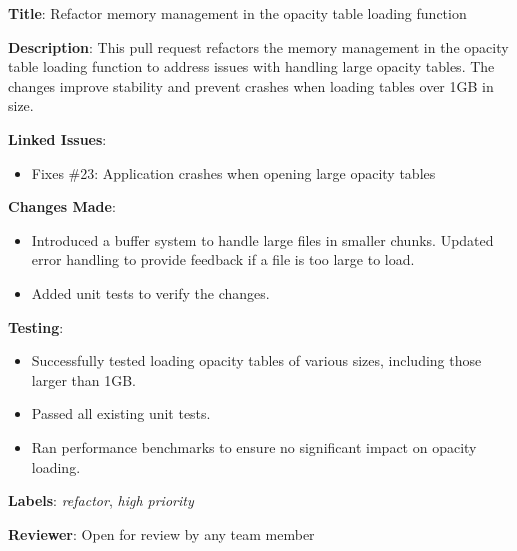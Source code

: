 \documentclass{ol-softwaremanual}
\begin{document}
\begin{example}
    \textbf{Title}: Refactor memory management in the opacity table loading function
    
    \textbf{Description}:
    This pull request refactors the memory management in the opacity table loading function to address issues with handling large opacity tables. The changes improve stability and prevent crashes when loading tables over 1GB in size.
    
    \textbf{Linked Issues}:
        \begin{itemize}
        \item Fixes \#23: Application crashes when opening large opacity tables
        \end{itemize}
    \textbf{Changes Made}:
    \begin{itemize}
        \item Introduced a buffer system to handle large files in smaller chunks.
        Updated error handling to provide feedback if a file is too large to load.
        \item Added unit tests to verify the changes.
    \end{itemize}
    \textbf{Testing}:
    \begin{itemize}
        \item Successfully tested loading opacity tables of various sizes, including those larger than 1GB.
        \item Passed all existing unit tests.
        \item Ran performance benchmarks to ensure no significant impact on opacity loading.
    \end{itemize}
    \textbf{Labels}: \textit{refactor}, \textit{high priority}
    
    \textbf{Reviewer}:
    Open for review by any team member
\end{example}
\end{document}
